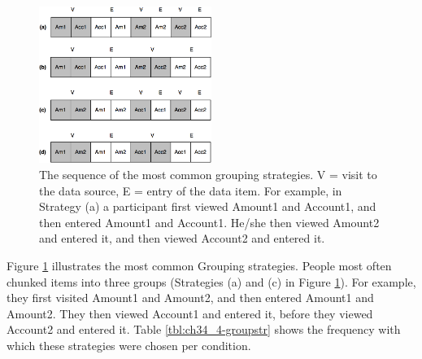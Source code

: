 \begin{table}
\begin{itemize}
\begin{figure}[!ht]
  \centering
    \includegraphics[width=0.5\textwidth]{images/Study4/ch34_4-groupstr.png}
      \caption{The sequence of the most common grouping strategies. V = visit to the data source, E = entry of the data item. For example, in Strategy (a) a participant first viewed Amount1 and Account1, and then entered Amount1 and Account1. He/she then viewed Amount2 and entered it, and then viewed Account2 and entered it.}
          \label{fig:ch34_4-groupstr}
\end{figure}

Figure \ref{fig:ch34_4-groupstr} illustrates the most common Grouping strategies. People most often chunked items into three groups (Strategies (a) and (c) in Figure \ref{fig:ch34_4-groupstr}). For example, they first visited Amount1 and Amount2, and then entered Amount1 and Amount2. They then viewed Account1 and entered it, before they viewed Account2 and entered it. Table \ref{tbl:ch34_4-groupstr} shows the frequency with which these strategies were chosen per condition. 


\end{itemize}
\end{table}
